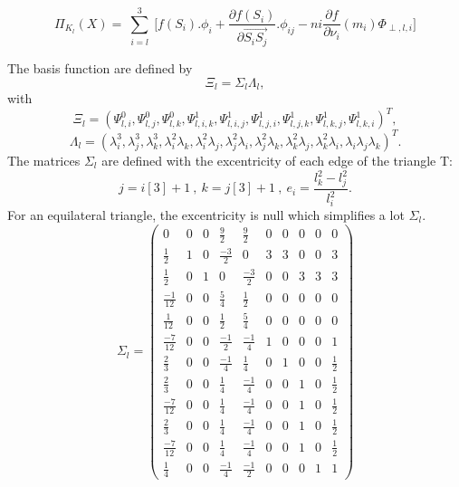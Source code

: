 \documentclass[proc]{edpsmath}
\begin{document}
\begin{equation*}
\Pi_{K_l} (X) = \sum \limits_{\substack{i=l }}^{3}{ [f(S_i).\phi_i +  \frac{\partial f(S_i)}{\partial  \overrightarrow{ S_i S_j } }.\phi_{ij} }   - ni \frac{\partial f}{\partial \nu_i}(m_i) \Phi_{\perp,l,i}]
\end{equation*} 

The basis function are defined by 
\begin{equation*}
\Xi_l =  \Sigma_l \Lambda_l,
\end{equation*} 
 \noindent with
\begin{equation*}
  \Xi_l=(\Psi_{l,i}^0, \Psi_{l,j}^0, \Psi_{l,k}^0, \Psi_{l,i,k}^1,\Psi_{l,i,j}^1,\Psi_{l,j,i}^1,\Psi_{l,j,k}^1 ,\Psi_{l,k,j}^1,\Psi_{l,k,i}^1)^T,
\end{equation*} 
\begin{equation*}
  \Lambda_l = ( \lambda_i^3,\lambda_j^3,\lambda_k^3,\lambda_i^2\lambda_k,\lambda_i^2\lambda_j,\lambda_j^2\lambda_i,\lambda_j^2\lambda_k,\lambda_k^2\lambda_j,\lambda_k^2\lambda_i,\lambda_i\lambda_j\lambda_k)^T.
\end{equation*}  
  \noindent The matrices $\Sigma_l$ are defined with the excentricity of each edge of the triangle T: 
\begin{equation*}
j=i[3]+1 ~,~ k=j[3]+1~,~ e_i = \frac{l_k^2 - l_j^2}{l_i^2}.
\end{equation*} 
For an equilateral triangle, the excentricity is null which simplifies a lot $\Sigma_l$.
\begin{equation*}
\Sigma_l = 
\begin{pmatrix}
	0 & 0 & 0 & \frac{9}{2} & \frac{9}{2} & 0 & 0 & 0 & 0 & 0  \\
	\frac{1}{2} & 1 & 0 & \frac{-3}{2} & 0 & 3 & 3 & 0 & 0 & 3 \\
	\frac{1}{2} & 0 & 1 & 0 & \frac{-3}{2} & 0 & 0 & 3 & 3 & 3 \\	 
	\frac{-1}{12} & 0 & 0 & \frac{ 5}{4} & \frac{ 1}{2} & 0 & 0 & 0 & 0 & 0 \\	 
	\frac{ 1}{12} & 0 & 0 & \frac{ 1}{2} & \frac{ 5}{4} & 0 & 0 & 0 & 0 & 0 \\
	\frac{-7}{12} & 0 & 0 & \frac{-1}{2} & \frac{-1}{4} & 1 & 0 & 0 & 0 & 1 \\
    \frac{ 2}{3}& 0 & 0 & \frac{-1}{4} & \frac{ 1}{4} & 0 & 1 & 0 & 0 & \frac{1}{2} \\
	\frac{ 2}{3}& 0 & 0 & \frac{ 1}{4} & \frac{-1}{4} & 0 & 0 & 1 & 0 & \frac{1}{2} \\
    \frac{-7}{12} & 0 & 0 & \frac{ 1}{4} & \frac{-1}{4} & 0 & 0 & 1 & 0 & \frac{1}{2} \\
	\frac{ 2}{3}& 0 & 0 & \frac{ 1}{4} & \frac{-1}{4} & 0 & 0 & 1 & 0 & \frac{1}{2} \\
    \frac{-7}{12} & 0 & 0 & \frac{ 1}{4} & \frac{-1}{4} & 0 & 0 & 1 & 0 & \frac{1}{2} \\
	\frac{1}{4} & 0 & 0 & \frac{-1}{4} & \frac{-1}{2} & 0 & 0 & 0 & 1 & 1 
\end{pmatrix}
\end{equation*}
\end{document}
